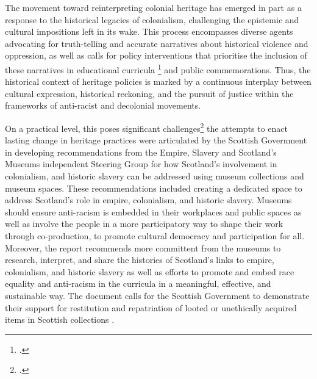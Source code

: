 \documentclass{scrartcl}
\renewcommand{\cite}{\parencite}
\begin{document}
 The movement toward reinterpreting colonial heritage has emerged in part as a response to the historical legacies of colonialism, challenging the epistemic and cultural impositions left in its wake. This process encompasses diverse agents advocating for truth-telling and accurate narratives about historical violence and oppression, as well as calls for policy interventions that prioritise the inclusion of these narratives in educational curricula \footcite[``(...) a consciousness that literature is a powerful instrument in evolving the cultural ethos of a people. They see literature as part of the whole ideological mechanism for integrating a people into the values of a dominant class, race,. nor nation. Imperialism -- particularly during colonialism -- provides the best example of how literature as an element of culture was used in the domination of Africa''][p.99]{ngugi_wa_thiongo_decolonising_1994} and public commemorations. Thus, the historical context of heritage policies is marked by a continuous interplay between cultural expression, historical reckoning, and the pursuit of justice within the frameworks of anti-racist and decolonial movements.
 
On a practical level, this poses significant challenges\footcite["Decolonising is not just about giving stuff back and doing more stuff for/with marginalised people–or being the host and venue for exciting webinars. It’s about committing to letting go of power and control and actively seeking ways to share them, whether decision-making or money or space or skills. We seek to dismantle processes that squeeze out human experiences and impact and systems which perpetuate the privilege of one over the other." ][]{tehmina_goskar_ethics_2020} the attempts to enact lasting change in heritage practices were articulated by the Scottish Government in developing recommendations from the Empire, Slavery and Scotland’s Museums independent Steering Group for how Scotland’s involvement in colonialism, and historic slavery can be addressed using museum collections and museum spaces. These recommendations included  creating a dedicated space to address Scotland's role in empire, colonialism, and historic slavery.  Museums should ensure anti-racism is embedded in their workplaces and public spaces as well as involve the people in a more participatory way to shape their work through co-production, to promote cultural democracy and participation for all. Moreover, the report recommends more committent from the museums to research, interpret, and share the histories of Scotland’s links to empire, colonialism, and historic slavery as well as efforts to promote and embed race equality and anti-racism in the curricula in a meaningful, effective, and sustainable way. The document calls for the Scottish Government to demonstrate their support for restitution and repatriation of looted or unethically acquired items in Scottish collections \cite[][]{essm_steering_group_empire_2022}.
\end{document}

